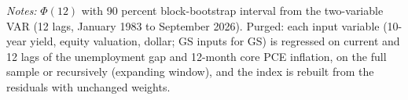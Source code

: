 \begin{table}[tbp]\centering\small
\caption{Does the Flow Survive Removing Activity?}\label{tab:purge}
\begin{flushleft}\footnotesize\textit{Notes:} $\Phi(12)$ with 90 percent block-bootstrap interval from the two-variable VAR (12 lags, January 1983 to September 2026). Purged: each input variable (10-year yield, equity valuation, dollar; GS inputs for GS) is regressed on current and 12 lags of the unemployment gap and 12-month core PCE inflation, on the full sample or recursively (expanding window), and the index is rebuilt from the residuals with unchanged weights.\end{flushleft}
\end{table}
